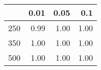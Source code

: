 % 
\begin{tabular}{rrrr}
  \hline
 & 0.01 & 0.05 & 0.1 \\ 
  \hline
250 & 0.99 & 1.00 & 1.00 \\ 
  350 & 1.00 & 1.00 & 1.00 \\ 
  500 & 1.00 & 1.00 & 1.00 \\ 
   \hline
\end{tabular}
